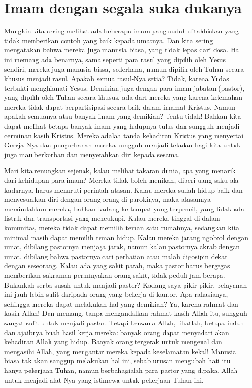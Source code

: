 \section*{Imam dengan segala suka dukanya}

Mungkin kita sering melihat ada beberapa imam yang sudah ditahbiskan yang tidak memberikan contoh yang baik kepada umatnya. Dan kita sering mengatakan bahwa mereka juga manusia biasa, yang tidak lepas dari dosa. Hal ini memang ada benarnya, sama seperti para rasul yang dipilih oleh Yesus sendiri, mereka juga manusia biasa, sederhana, namun dipilih oleh Tuhan secara khusus menjadi rasul. Apakah semua rasul-Nya setia? Tidak, karena Yudas terbukti menghianati Yesus. Demikian juga dengan para imam jabatan (pastor), yang dipilih oleh Tuhan secara khusus, ada dari mereka yang karena kelemahan mereka tidak dapat berpartisipasi secara baik dalam imamat Kristus. Namun apakah semuanya atau banyak imam yang demikian? Tentu tidak! Bahkan kita dapat melihat betapa banyak imam yang hidupnya tulus dan sungguh menjadi cerminan kasih Kristus. Mereka adalah tanda kehadiran Kristus yang menyertai Gereja-Nya dan pengorbanan mereka sungguh menjadi teladan bagi kita untuk juga mau berkorban dan menyerahkan diri kepada sesama.

Mari kita renungkan sejenak, kalau melihat takaran dunia, apa yang menarik dari kehidupan para imam? Mereka tidak boleh menikah, diberi uang saku ala kadarnya, harus menuruti perintah atasan. Kalau mereka sudah hidup baik dan menyesuaikan diri dengan orang-orang di parokinya, maka atasannya memindahkan mereka, bahkan kadang ke tempat yang terpencil, yang tidak ada listrik dan transportasi yang mencukupi. Kalau mereka tinggal di dalam komunitas, mereka tidak dapat memilih teman satu rumahnya, sedangkan kita minimal masih dapat memilih teman hidup. Kalau mereka jarang ngobrol dengan umat, dibilang pastornya menjaga jarak, namun kalau pastornya akrab dengan umat, dibilang bahwa pastornya cari perhatian atau malah digosipin dekat dengan seseorang. Kalau ada yang sakit parah, maka pastor harus bergegas memberikan sakramen perminyakan orang sakit, tidak peduli jam berapa. Bukankah serba susah untuk menjadi pastor? Kadang saya pikir-pikir, pelayanan ini jauh lebih sulit daripada orang yang bekerja di kantor. Apa rahasianya, sehingga mereka dapat melakukan hal yang demikian? Ya, karena rahmat dan kasih Allah! Dan memang, tanpa mengandalkan rahmat kasih Allah itu, sungguh sangat sulit untuk menjadi pastor. Tetapi bersama Allah, lihatlah, betapa indah dan ajaibnya buah hasil kerja mereka: banyak orang dapat menyadari akan kehadiran Allah yang hidup. Banyak orang tergerak untuk mengenal dan mengasihi Allah, yang mengantar mereka kepada keselamatan kekal! Manusia biasa tak akan sanggup melakukan hal ini, sebab urusan mengubah hati itu hanya pekerjaan Tuhan, namun berbahagialah para pastor yang dipakai Allah untuk menjadi alat-Nya yang istimewa untuk pekerjaan Tuhan ini.

